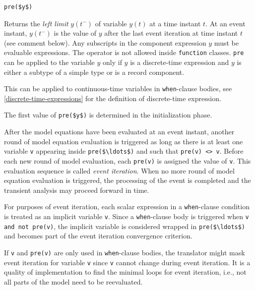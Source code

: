 \begin{operatordefinition}[pre]
\begin{synopsis}\begin{lstlisting}
pre($y$)
\end{lstlisting}\end{synopsis}
\begin{semantics}
Returns the \emph{left limit} $y(t^{-})$ of variable $y(t)$ at a time instant $t$.
At an event instant, $y(t^{-})$ is the value of $y$ after the last event iteration at time instant $t$ (see comment below).
Any subscripts in the component expression $y$ must be evaluable expressions.
The operator is not allowed inside \lstinline!function! classes.
\lstinline!pre! can be applied to the variable $y$ only if $y$ is a discrete-time expression and $y$ is either a subtype of a simple type or is a record component.
\begin{nonnormative}
This can be applied to continuous-time variables in \lstinline!when!-clause bodies, see \cref{discrete-time-expressions} for the definition of discrete-time expression.
\end{nonnormative}
The first value of \lstinline!pre($y$)! is determined in the initialization phase.

After the model equations have been evaluated at an event instant, another round of model equation evaluation is triggered as long as there is at least one variable \lstinline!v! appearing inside \lstinline!pre($\ldots$)! and such that \lstinline!pre(v) <> v!.
Before each new round of model evaluation, each \lstinline!pre(v)! is assigned the value of \lstinline!v!.
This evaluation sequence is called \emph{event iteration}.
When no more round of model equation evaluation is triggered, the processing of the event is completed and the transient analysis may proceed forward in time.

For purposes of event iteration, each scalar expression in a \lstinline!when!-clause condition is treated as an implicit variable \lstinline!v!.
Since a \lstinline!when!-clause body is triggered when \lstinline!v and not pre(v)!, the implicit variable is considered wrapped in \lstinline!pre($\ldots$)! and becomes part of the event iteration convergence criterion.

\begin{nonnormative}
If \lstinline!v! and \lstinline!pre(v)! are only used in \lstinline!when!-clause bodies, the translator might mask event iteration for variable \lstinline!v! since \lstinline!v! cannot change during event iteration.
It is a quality of implementation to find the minimal loops for event iteration, i.e., not all parts of the model need to be reevaluated.


\end{nonnormative}
\end{semantics}
\end{operatordefinition}
